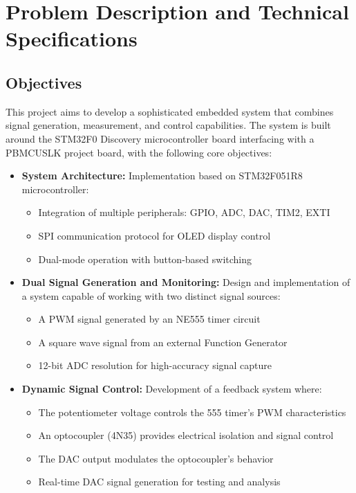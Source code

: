\section{Problem Description and Technical Specifications}\label{sec:problem-descr}

\subsection{Objectives}
This project aims to develop a sophisticated embedded system that combines signal generation, measurement, and control capabilities. The system is built around the STM32F0 Discovery microcontroller board interfacing with a PBMCUSLK project board, with the following core objectives:

\begin{itemize}[leftmargin=2em]
    \item \textbf{System Architecture:} Implementation based on STM32F051R8 microcontroller:
    \begin{itemize}
        \item Integration of multiple peripherals: GPIO, ADC, DAC, TIM2, EXTI
        \item SPI communication protocol for OLED display control
        \item Dual-mode operation with button-based switching
    \end{itemize}
    
    \item \textbf{Dual Signal Generation and Monitoring:} Design and implementation of a system capable of working with two distinct signal sources:
    \begin{itemize}
        \item A PWM signal generated by an NE555 timer circuit
        \item A square wave signal from an external Function Generator
        \item 12-bit ADC resolution for high-accuracy signal capture
    \end{itemize}
    
    \item \textbf{Dynamic Signal Control:} Development of a feedback system where:
    \begin{itemize}
        \item The potentiometer voltage controls the 555 timer's PWM characteristics
        \item An optocoupler (4N35) provides electrical isolation and signal control
        \item The DAC output modulates the optocoupler's behavior
        \item Real-time DAC signal generation for testing and analysis
    \end{itemize}
    

\end{itemize}
